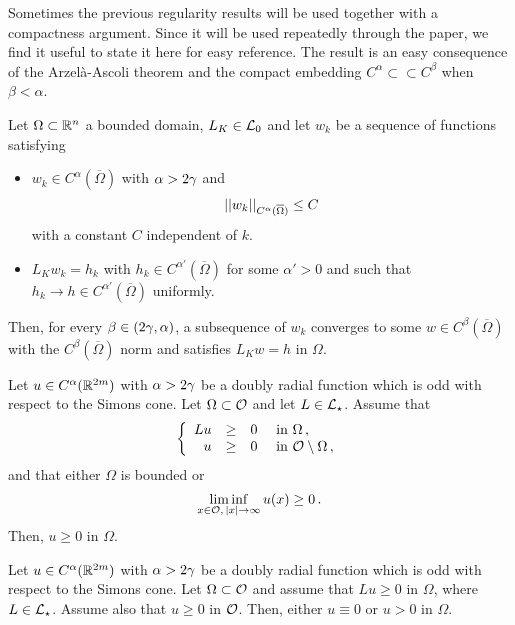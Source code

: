 Sometimes the previous regularity results will be used together with a compactness argument. Since it will be used repeatedly through the paper, we find it useful to state it here for easy reference. The result is an easy consequence of the Arzelà-Ascoli theorem and the compact embedding $C^\alpha \subset \subset C^\beta$ when $\beta < \alpha$.

\begin{lemma}
	\label{Lemma:CompactnessLemma} Let $\Omega\subset \mathbb{R}^n$ a bounded domain, $L_K \in \mathcal{L}_0$ and let
	$w_k$ be a sequence of functions satisfying
	\begin{itemize}
		\item $w_k \in C^\alpha (\overline{\Omega})$ with $\alpha > 2\gamma$ and
		$$
		\left | \left |{w_k} \right | \right |_{C^\alpha (\overline{\Omega})} \leq C
		$$
		with a constant $C$ independent of $k$.
		\item $L_K  w_k = h_k$ with $h_k \in C^{\alpha'}(\overline{\Omega})$ for some $\alpha' > 0$ and such
		that $h_k \to h \in C^{\alpha'}(\overline{\Omega})$ uniformly.
	\end{itemize}
	Then, for every $\beta \in (2\gamma, \alpha)$, a subsequence of $w_k$ converges to some $w \in C^\beta
	(\overline{\Omega})$ with the $C^\beta (\overline{\Omega})$ norm and satisfies $L_K w = h$ in
	$\Omega$.
\end{lemma}


\begin{proposition}
\label{Prop:WeakMaximumPrincipleForOddFunctions} Let $u\in C^{\alpha}(\mathbb{R}^{2m})$ with $\alpha > 2\gamma$ be a doubly radial function which is odd with respect to the Simons cone. Let $\Omega \subset \mathcal{O}$ and let $L \in \mathcal{L}_\star$. Assume that
$$
\left\{\begin{array}{rcll}
Lu & \geq & 0 & \text{ in } \Omega\,,\\
u & \geq & 0 & \text{ in } \mathcal{O} \setminus \Omega\,,
\end{array} \right.
$$
and that either $\Omega$ is bounded or 
$$
\liminf_{x \in \mathcal{O},\,|x|\to \infty} u(x) \geq 0\,.
$$
Then, $u \geq 0$ in $\Omega$.
\end{proposition}


\begin{proposition}
\label{Prop:StrongMaximumPrincipleForOddFunctions} Let $u\in C^{\alpha}(\mathbb{R}^{2m})$ with
$\alpha > 2\gamma$ be a doubly radial function which is odd with respect to the Simons cone.  Let
$\Omega \subset \mathcal{O}$ and assume that $Lu \geq 0$ in $\Omega$, where $L \in \mathcal{L}_\star$. Assume also that $u\geq 0$ in $\mathcal{O}$.
Then, either $u\equiv 0$ or $u > 0$ in $\Omega$.
\end{proposition}

